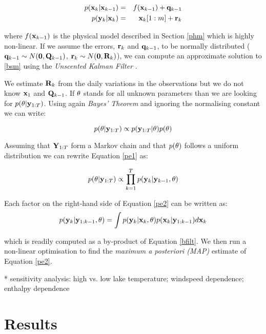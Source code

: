 \documentclass{bmc_template/bmcart}
\newcommand{\bm}[1]{{\bf #1}}
\begin{document}
\begin{eqnarray}
p(\bm{x}_k|\bm{x}_{k-1}) & = & f(\bm{x}_{k-1}) + \bm{q}_{k-1} \\
    p(\bm{y}_k|\bm{x}_k) & = & \bm{x}_k[1:m] + \bm{r}_k   
\end{eqnarray}

where $f(\bm{x}_{k-1})$ is the physical model described in Section \ref{phm}
which is highly non-linear. If we assume the errors, $\bm{r}_k$ and
$\bm{q}_{k-1}$, to be normally distributed ($\bm{q}_{k-1} \sim N(\bm{0},
\bm{Q}_{k-1})$, $\bm{r}_k \sim N(\bm{0}, \bm{R}_k)$), we can compute an
approximate solution to \ref{bsm} using the \textit{Unscented Kalman Filter}
\citep{Merwe2004}.

We estimate $\bm{R}_k$ from the daily variations in the observations but we do
not know $\bm{x}_1$ and $\bm{Q}_{k-1}$. If $\bm{\theta}$ stands for all unknown
parameters than we are looking for $p(\bm{\theta}|\bm{y}_{1:T})$. Using again
\textit{Bayes' Theorem} and ignoring the normalising constant we can write:

\begin{equation}\label{pe1}
    p(\bm{\theta}|\bm{y}_{1:T}) \propto p(\bm{y}_{1:T}|\bm{\theta})p(\bm{\theta})
\end{equation}

Assuming that $\bm{Y}_{1:T}$ form a Markov chain and that $p(\bm{\theta})$ follows
a uniform distribution we can rewrite Equation \ref{pe1} as:

\begin{equation}\label{pe2}
    p(\bm{\theta}|\bm{y}_{1:T}) \propto \prod_{k=1}^Tp(\bm{y}_{k}|\bm{y}_{k-1}, \bm{\theta})
\end{equation}

Each factor on the right-hand side of Equation \ref{pe2} can be written as:
\begin{equation}
    p(\bm{y}_k|\bm{y}_{1:k-1}, \bm{\theta}) = \int p(\bm{y}_k|\bm{x}_k, \bm{\theta})p(\bm{x}_k|\bm{y}_{1:k-1})d\bm{x}_k
\end{equation}

which is readily computed as a by-product of Equation \ref{bfilt}. We then run
a non-linear optimisation to find the \textit{maximum a posteriori (MAP)}
estimate of Equation \ref{pe2}. 

* sensitivity analysis: high vs. low lake temperature; windspeed dependence;
  enthalpy dependence

\section*{Results}
\end{document}
